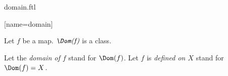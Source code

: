 \documentclass{stex}
\begin{document}
\begin{smodule}{domain.ftl}


[name=domain]{}

\begin{fakeforthel}
  \begin{signature}
    Let $f$ be a map.
    $\emph{\Dom(f)}$ is a class.
  \end{signature}
\end{fakeforthel}

\begin{forthel}
  \begin{convention}
    Let the \emph{domain of $f$} stand for $\Dom(f)$.
    Let $f$ is \emph{defined on $X$} stand for $\Dom(f) = X$.
  \end{convention}
\end{forthel}

\end{smodule}
\end{document}
